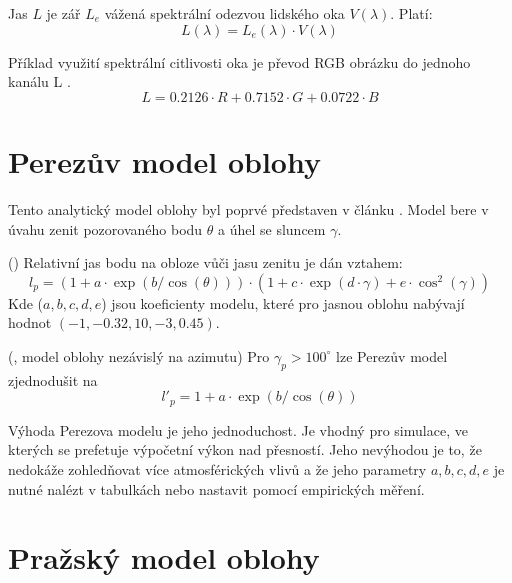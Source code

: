 \begin{definice}
  Jas $L$ je zář $L_e$ vážená spektrální odezvou lidského oka $V(\lambda)$. Platí:
  \begin{equation}
    L(\lambda) = L_e(\lambda) \cdot V(\lambda)
  \end{equation}
\end{definice}

Příklad využití spektrální citlivosti oka je převod RGB obrázku do jednoho kanálu L \citep{rgbgray}.
\begin{equation}
  L = 0.2126 \cdot R + 0.7152 \cdot G + 0.0722 \cdot B 
\end{equation}

\section{Perezův model oblohy}
Tento analytický model oblohy byl poprvé představen v článku \cite{Perez93}.
Model bere v úvahu zenit pozorovaného bodu $\theta$ a úhel se sluncem $\gamma$.

\begin{veta}\label{veta01:1}(\citealp{Perez93})
Relativní jas bodu na obloze vůči jasu zenitu je dán vztahem:
\begin{equation}\label{eq01:5}
  l_p = (1 + a \cdot \exp(b/\cos(\theta))) \cdot (1 + c \cdot \exp(d \cdot \gamma) + e \cdot \cos^2(\gamma))
\end{equation}
    Kde ($a, b, c, d, e$) jsou koeficienty modelu, které pro jasnou oblohu nabývají hodnot $(-1, -0.32, 10, -3, 0.45)$.
\end{veta}

\begin{veta}\label{veta01:2}(\citealp{Lalonde10}, model oblohy nezávislý na azimutu)
  Pro $\gamma_p>100^\circ$ lze Perezův model zjednodušit na
  \begin{equation}\label{eq01:5}
  l'_p = 1 + a \cdot \exp(b/\cos(\theta))
  \end{equation}
  \end{veta}

Výhoda Perezova modelu je jeho jednoduchost. Je vhodný pro simulace, ve kterých se prefetuje výpočetní výkon nad přesností. Jeho nevýhodou je to, že nedokáže zohledňovat více atmosférických vlivů a že jeho parametry $a, b, c, d, e$ je nutné nalézt v tabulkách nebo nastavit pomocí empirických měření.

\section{Pražský model oblohy}

